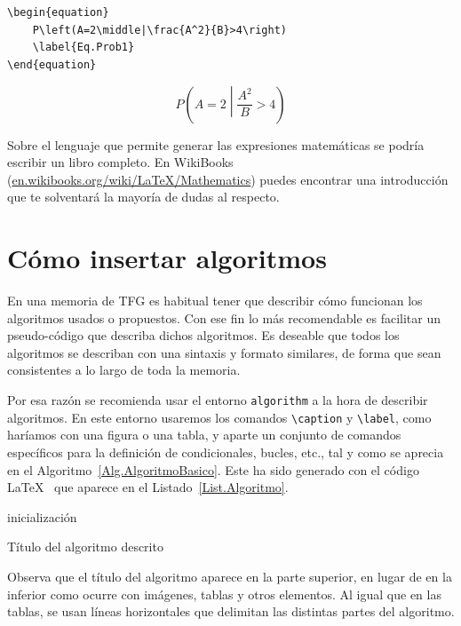 \begin{lstlisting}[language={[LaTeX]TeX},caption={Definición de una ecuación},label=List.Ecuacion]
\begin{equation}
    P\left(A=2\middle|\frac{A^2}{B}>4\right)
    \label{Eq.Prob1}
\end{equation}
\end{lstlisting}

\begin{equation}
    P\left(A=2\middle|\frac{A^2}{B}>4\right)
    \label{Eq.Prob1}
\end{equation}

Sobre el lenguaje que permite generar las expresiones matemáticas se podría escribir un libro completo. En WikiBooks (\url{en.wikibooks.org/wiki/LaTeX/Mathematics}) puedes encontrar una introducción que te solventará la mayoría de dudas al respecto.

\section{Cómo insertar algoritmos}

En una memoria de TFG es habitual tener que describir cómo funcionan los algoritmos usados o propuestos. Con ese fin lo más recomendable es facilitar un pseudo-código que describa dichos algoritmos. Es deseable que todos los algoritmos se describan con una sintaxis y formato similares, de forma que sean consistentes a lo largo de toda la memoria.

Por esa razón se recomienda usar el entorno \verb|algorithm| a la hora de describir algoritmos. En este entorno usaremos los comandos \verb|\caption| y \verb|\label|, como haríamos con una figura o una tabla, y aparte un conjunto de comandos específicos para la definición de condicionales, bucles, etc., tal y como se aprecia en el Algoritmo~\ref{Alg.AlgoritmoBasico}. Este ha sido generado con el código \LaTeX~ que aparece en el Listado~\ref{List.Algoritmo}.

\begin{algorithm}[H]
\SetAlgoLined
{}
 inicialización\;
 \caption{Título del algoritmo descrito}
 \label{Alg.AlgoritmoBasico}
\end{algorithm}

Observa que el título del algoritmo aparece en la parte superior, en lugar de en la inferior como ocurre con imágenes, tablas y otros elementos. Al igual que en las tablas, se usan líneas horizontales que delimitan las distintas partes del algoritmo.

